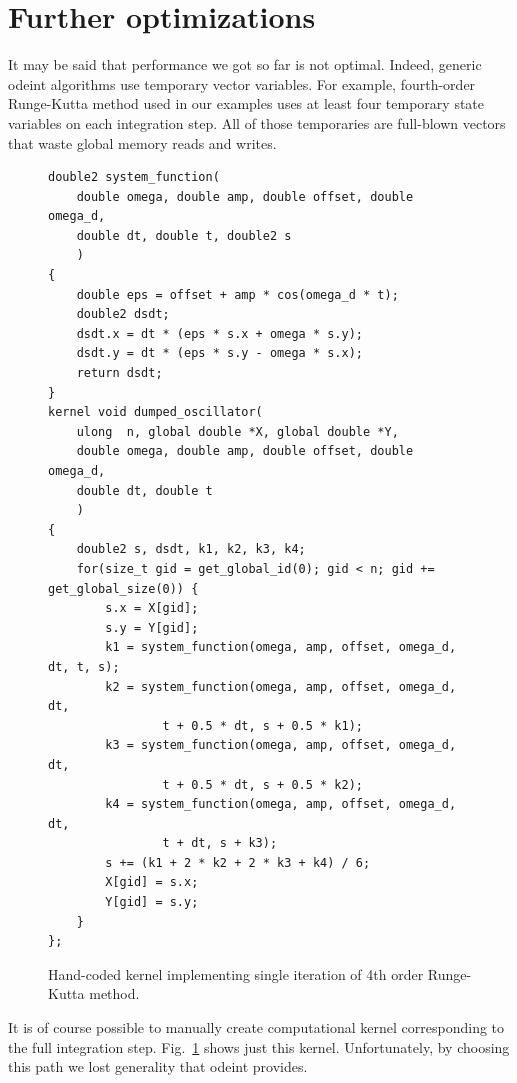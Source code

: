 \documentclass[1p]{elsarticle}
\newcommand{\figref}[1]{Fig.~\ref{#1}}
\begin{document}
%
%
\section{Further optimizations}

It may be said that performance we got so far is not optimal. Indeed, generic
odeint algorithms use temporary vector variables. For example, fourth-order
Runge-Kutta method used in our examples uses at least four temporary state
variables on each integration step. All of those temporaries are full-blown
vectors that waste global memory reads and writes. 

\begin{figure}[p]
\begin{lstlisting}
double2 system_function(
    double omega, double amp, double offset, double omega_d,
    double dt, double t, double2 s
    )
{
    double eps = offset + amp * cos(omega_d * t);
    double2 dsdt;
    dsdt.x = dt * (eps * s.x + omega * s.y);
    dsdt.y = dt * (eps * s.y - omega * s.x);
    return dsdt;
}
kernel void dumped_oscillator(
    ulong  n, global double *X, global double *Y,
    double omega, double amp, double offset, double omega_d,
    double dt, double t
    )
{
    double2 s, dsdt, k1, k2, k3, k4;
    for(size_t gid = get_global_id(0); gid < n; gid += get_global_size(0)) {
        s.x = X[gid];
        s.y = Y[gid];
        k1 = system_function(omega, amp, offset, omega_d, dt, t, s);
        k2 = system_function(omega, amp, offset, omega_d, dt,
                t + 0.5 * dt, s + 0.5 * k1);
        k3 = system_function(omega, amp, offset, omega_d, dt,
                t + 0.5 * dt, s + 0.5 * k2);
        k4 = system_function(omega, amp, offset, omega_d, dt,
                t + dt, s + k3);
        s += (k1 + 2 * k2 + 2 * k3 + k4) / 6;
        X[gid] = s.x;
        Y[gid] = s.y;
    }
};

\end{lstlisting}
\caption{Hand-coded kernel implementing single iteration of 4th order
Runge-Kutta method.}
\label{code:customkrn}
\end{figure}

It is of course possible to manually create computational kernel corresponding
to the full integration step. \figref{code:customkrn} shows just this
kernel. Unfortunately, by choosing this path we lost generality that odeint
provides.
\end{document}
